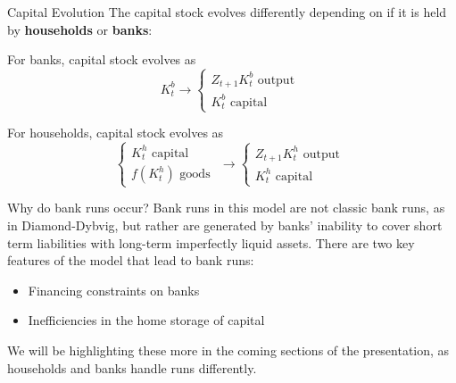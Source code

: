 \documentclass[
	11pt, %
	aspectratio=169, %
]{beamer}
\begin{document}
\begin{frame}{Capital Evolution}
    The capital stock evolves differently depending on if it is held by \textbf{households} or \textbf{banks}:
    \begin{Definition}
        For banks, capital stock evolves as
        \begin{equation}
            K_{t}^b\rightarrow\begin{cases}
                Z_{t+1}K_t^b \text{ output }\\
                K_t^b \text{ capital }
            \end{cases}
        \end{equation}
    \end{Definition}
    \begin{Definition}
        For households, capital stock evolves as
        \begin{equation}
            \begin{cases}
                K_{t}^h \text{ capital }\\
                f(K_t^h) \text{ goods }
            \end{cases}
            \rightarrow\begin{cases}
                Z_{t+1}K_t^h \text{ output }\\
                K_t^h \text{ capital }
            \end{cases}
        \end{equation}
    \end{Definition}
\end{frame}
\begin{frame}{Why do bank runs occur?}
    Bank runs in this model are not classic bank runs, as in Diamond-Dybvig, but rather are generated
    by banks' inability to cover short term liabilities with long-term imperfectly liquid assets.
    \bigbreak 
    There are two key features of the model that lead to bank runs:
    \begin{itemize}
        \item Financing constraints on banks
        \item Inefficiencies in the home storage of capital
    \end{itemize}
    \bigskip
    We will be highlighting these more in the coming sections of the presentation, as households and 
    banks handle runs differently.
\end{frame}
\end{document}
